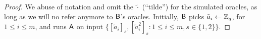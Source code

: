 \begin{proof}
We abuse of notation and omit the $\tilde{\cdot}$ (``tilde'') for the simulated oracles, as long as we will no refer anymore to $\mathsf{B}$'s oracles. Initially, $\mathsf{B}$ picks $\tilde{a}_{i}\gets\mathbb{Z}_q$, for $1\leq i \leq m$, and runs $\mathsf{A}$ on input $\{[\tilde{a}_{i}]_s,[\tilde{a}^2_{i}]_s:1\leq i\leq m, s\in\{1,2\}\}$.
%
%
%

\end{proof}
